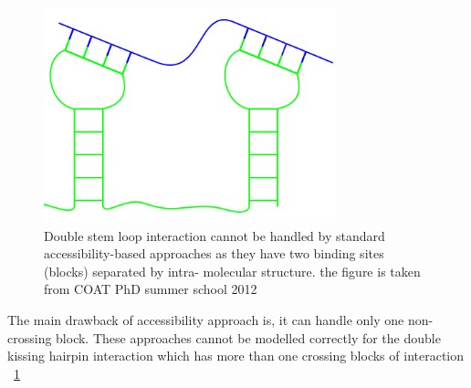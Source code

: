 \documentclass[twoside,a4paper]{report}
\begin{document}
		\begin{figure}[tb]
		\includegraphics[width=0.4\linewidth]{doublestem}
		\centering
		\caption{ Double stem loop interaction cannot be handled by standard accessibility-based approaches as they have two binding sites (blocks) separated by intra- molecular structure. the figure is taken from COAT PhD summer school 2012} 
		\label{Fig:doublestem}
	\end{figure}
	
	
	The main drawback of accessibility approach is, it can handle only one non-crossing block. These approaches cannot be modelled correctly for the double kissing hairpin interaction which has more than one crossing blocks of interaction ~\ref{Fig:doublestem}\\
	
	
\end{document}
